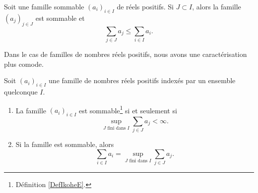 \begin{lemma}   \label{LEMooAYFUooLMBBDn}
    Soit une famille sommable \( (a_i)_{i\in I}\) de réels positifs. Si \( J\subset I\), alors la famille \( (a_j)_{j\in J}\) est sommable et 
    \begin{equation}
        \sum_{j\in J}a_j\leq \sum_{i\in I} a_i.
    \end{equation}
\end{lemma}

Dans le cas de familles de nombres réels positifs, nous avons une caractérisation plus comode.
\begin{proposition}  \label{PROPooOYNRooQFpBly}  
	Soit \( (a_i)_{i\in I}\) une famille de nombres réels positifs indexés par un ensemble quelconque \( I\). 
    \begin{enumerate}
        \item       \label{ITEMooAYKKooVxXp}
            La famille \( (a_i)_{i\in I}\) est sommable\footnote{Définition \ref{DefIkoheE}.} si et seulement si
            \begin{equation}
                \sup_{ J\text{ fini dans } I}\sum_{j\in J}a_j<\infty.
            \end{equation}
        \item       \label{ITEMooSDCYooNsbHez}
            Si la famille est sommable, alors
            \begin{equation}
                \sum_{i\in I}a_i=\sup_{ J\text{ fini dans } I}\sum_{j\in J}a_j.
            \end{equation}
    \end{enumerate}
\end{proposition}

